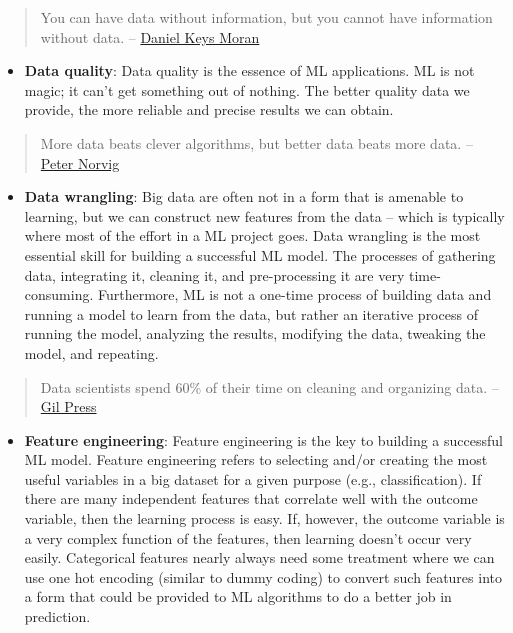 \documentclass[]{book}
\providecommand{\tightlist}{%
  \setlength{\itemsep}{0pt}\setlength{\parskip}{0pt}}
\begin{document}
\begin{quote}
You can have data without information, but you cannot have information without data. -- \href{https://en.wikipedia.org/wiki/Daniel_Keys_Moran}{Daniel Keys Moran}
\end{quote}

\begin{itemize}
\tightlist
\item
  \textbf{Data quality}: Data quality is the essence of ML applications. ML is not magic; it can't get something out of nothing. The better quality data we provide, the more reliable and precise results we can obtain.
\end{itemize}

\begin{quote}
More data beats clever algorithms, but better data beats more data. -- \href{https://en.wikipedia.org/wiki/Peter_Norvig}{Peter Norvig}
\end{quote}

\begin{itemize}
\tightlist
\item
  \textbf{Data wrangling}: Big data are often not in a form that is amenable to learning, but we can construct new features from the data -- which is typically where most of the effort in a ML project goes. Data wrangling is the most essential skill for building a successful ML model. The processes of gathering data, integrating it, cleaning it, and pre-processing it are very time-consuming. Furthermore, ML is not a one-time process of building data and running a model to learn from the data, but rather an iterative process of running the model, analyzing the results, modifying the data, tweaking the model, and repeating.
\end{itemize}

\begin{quote}
Data scientists spend 60\% of their time on cleaning and organizing data. -- \href{https://www.forbes.com/sites/gilpress/2016/03/23/data-preparation-most-time-consuming-least-enjoyable-data-science-task-survey-says/\#7dfde9af6f63}{Gil Press}
\end{quote}

\begin{itemize}
\tightlist
\item
  \textbf{Feature engineering}: Feature engineering is the key to building a successful ML model. Feature engineering refers to selecting and/or creating the most useful variables in a big dataset for a given purpose (e.g., classification). If there are many independent features that correlate well with the outcome variable, then the learning process is easy. If, however, the outcome variable is a very complex function of the features, then learning doesn't occur very easily. Categorical features nearly always need some treatment where we can use one hot encoding (similar to dummy coding) to convert such features into a form that could be provided to ML algorithms to do a better job in prediction.
\end{itemize}
\end{document}
